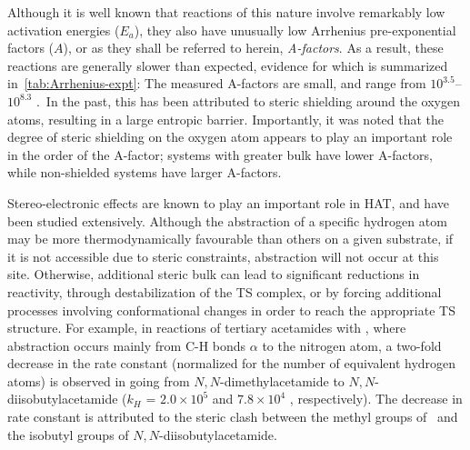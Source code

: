 
Although it is well known that reactions of this nature involve remarkably low activation energies ($E_a$),\cite{Lucarini1996, Mahoney1970a, Mahoney1975, Korcek1972} they also have unusually low Arrhenius pre-exponential factors ($A$), or as they shall be referred to herein, \emph{A-factors}. As a result, these reactions are generally slower than expected, evidence for which is summarized in~\ref{tab:Arrhenius-expt}: The measured A-factors are small, and range from $10^{3.5}$--$10^{8.3}$ \Ms.\
In the past, this has been attributed to steric shielding around the oxygen atoms, resulting in a large entropic barrier.\cite{DiLabio2005} Importantly, it was noted that the degree of steric shielding on the oxygen atom appears to play an important role in the order of the A-factor; systems with greater bulk have lower A-factors, while non-shielded systems have larger A-factors.

Stereo-electronic effects are known to play an important role in HAT, and have been studied extensively.\cite{Finn2004, Salamone2011, Pischel2001, Griller1981, Bietti2011, Salamone2012, Malatesta1982, Salamone2014} Although the abstraction of a specific hydrogen atom may be more thermodynamically favourable than others on a given substrate, if it is not accessible due to steric constraints, abstraction will not occur at this site. Otherwise, additional steric bulk can lead to significant reductions in reactivity, through destabilization of the TS complex, or by forcing additional processes involving conformational changes in order to reach the appropriate TS structure. For example, in reactions of tertiary acetamides with \cumo,\cite{Salamone2014} where abstraction occurs mainly from C-H bonds $\alpha$ to the nitrogen atom, a two-fold decrease in the rate constant (normalized for the number of equivalent hydrogen atoms) is observed in going from $N,N$-dimethylacetamide to $N,N$-diisobutylacetamide ($k_H$ = $2.0 \times 10^5$ and $7.8 \times 10^4$ \Ms, respectively). The decrease in rate constant is attributed to the steric clash between the methyl groups of \cumo\ and the isobutyl groups of $N,N$-diisobutylacetamide.

